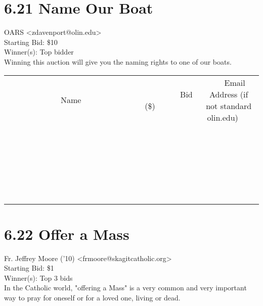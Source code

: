 \documentclass[11pt]{article}
\begin{document}
					\section*{6.21 Name Our Boat}
					OARS <zdavenport@olin.edu> \\
					Starting Bid: \$10 \\
					Winner(s): Top bidder \\
					Winning this auction will give you the naming rights to one of our boats. \\
					[6ex]
					\begin{tabular}{c c c}
						~~~~~~~~~~~~~Name~~~~~~~~~~~~~ & ~~~~~~~~~Bid (\$)~~~~~~~~~ & ~~~Email Address (if not standard olin.edu)~~~ \\
				
 & & \\
\hline
 & & \\
\hline
 & & \\
\hline
 & & \\
\hline
 & & \\
\hline
 & & \\
\hline
 & & \\
\hline
 & & \\
\hline
 & & \\
\hline
 & & \\
\hline
 & & \\
\hline
 & & \\
\hline
 & & \\
\hline
 & & \\
\hline
 & & \\
\hline
 & & \\
\hline
 & & \\
\hline
 & & \\
\hline
 & & \\
\hline
 & & \\
\hline
 & & \\
\hline
 & & \\
\hline
 & & \\
\hline
 & & \\
\hline
 & & \\
\hline
 & & \\
\hline
					\end{tabular}
					\clearpage
				
					\section*{6.22 Offer a Mass}
					Fr. Jeffrey Moore ('10) <frmoore@skagitcatholic.org> \\
					Starting Bid: \$1 \\
					Winner(s): Top 3 bids \\
					In the Catholic world, "offering a Mass" is a very common and very important way to pray for oneself or for a loved one, living or dead.
\end{document}
